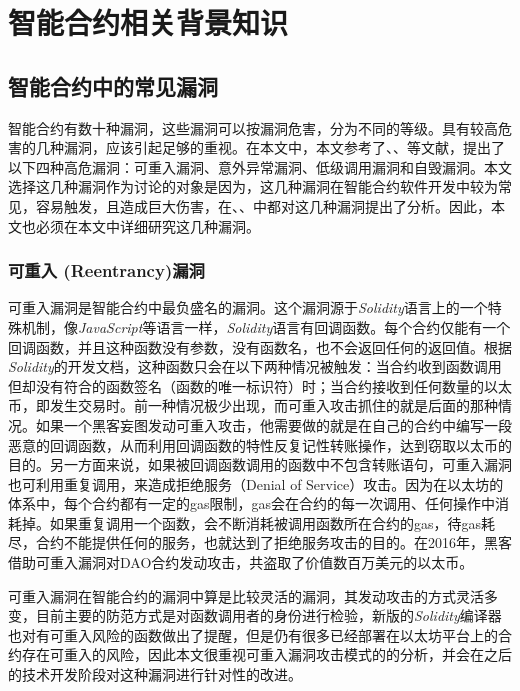 
\chapter{智能合约相关背景知识}

\section{智能合约中的常见漏洞}

智能合约有数十种漏洞，这些漏洞可以按漏洞危害，分为不同的等级。具有较高危害的几种漏洞，应该引起足够的重视。在本文中，本文参考了、、等文献，提出了以下四种高危漏洞：可重入漏洞、意外异常漏洞、低级调用漏洞和自毁漏洞。本文选择这几种漏洞作为讨论的对象是因为，这几种漏洞在智能合约软件开发中较为常见，容易触发，且造成巨大伤害，在、、中都对这几种漏洞提出了分析。因此，本文也必须在本文中详细研究这几种漏洞。

\subsection{可重入 (Reentrancy)漏洞}

可重入漏洞是智能合约中最负盛名的漏洞。这个漏洞源于\emph{Solidity}语言上的一个特殊机制，像\emph{JavaScript}等语言一样，\emph{Solidity}语言有回调函数。每个合约仅能有一个回调函数，并且这种函数没有参数，没有函数名，也不会返回任何的返回值。根据\emph{Solidity}的开发文档，这种函数只会在以下两种情况被触发：当合约收到函数调用但却没有符合的函数签名（函数的唯一标识符）时；当合约接收到任何数量的以太币，即发生交易时。前一种情况极少出现，而可重入攻击抓住的就是后面的那种情况。如果一个黑客妄图发动可重入攻击，他需要做的就是在自己的合约中编写一段恶意的回调函数，从而利用回调函数的特性反复记性转账操作，达到窃取以太币的目的。另一方面来说，如果被回调函数调用的函数中不包含转账语句，可重入漏洞也可利用重复调用，来造成拒绝服务（Denial of Service）攻击。因为在以太坊的体系中，每个合约都有一定的gas限制，gas会在合约的每一次调用、任何操作中消耗掉。如果重复调用一个函数，会不断消耗被调用函数所在合约的gas，待gas耗尽，合约不能提供任何的服务，也就达到了拒绝服务攻击的目的。在2016年，黑客借助可重入漏洞对DAO合约发动攻击，共盗取了价值数百万美元的以太币。

可重入漏洞在智能合约的漏洞中算是比较灵活的漏洞，其发动攻击的方式灵活多变，目前主要的防范方式是对函数调用者的身份进行检验，新版的\emph{Solidity}编译器也对有可重入风险的函数做出了提醒，但是仍有很多已经部署在以太坊平台上的合约存在可重入的风险，因此本文很重视可重入漏洞攻击模式的的分析，并会在之后的技术开发阶段对这种漏洞进行针对性的改进。

